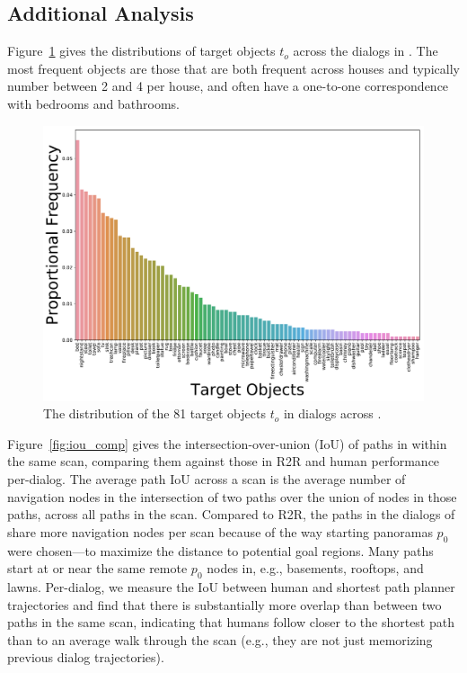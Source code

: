 
\subsection{Additional \dataset{} Analysis}

Figure~\ref{fig:object_dist} gives the distributions of target objects $t_o$ across the dialogs in \dataset{}.
The most frequent objects are those that are both frequent across houses and typically number between 2 and 4 per house, and often have a one-to-one correspondence with bedrooms and bathrooms.

\begin{figure}[ht]
\centering
\includegraphics[width=0.9\columnwidth]{figures/target_object_distribution.pdf}
\caption{The distribution of the 81 target objects $t_o$ in dialogs across \dataset{}.}
\label{fig:object_dist}
\end{figure}

Figure~\ref{fig:iou_comp} gives the intersection-over-union (IoU) of paths in \dataset{} within the same scan, comparing them against those in R2R and human performance per-dialog.
The average path IoU across a scan is the average number of navigation nodes in the intersection of two paths over the union of nodes in those paths, across all paths in the scan.
Compared to R2R, the paths in the dialogs of \dataset{} share more navigation nodes per scan because of the way starting panoramas $p_0$ were chosen---to maximize the distance to potential goal regions.
Many \dataset{} paths start at or near the same remote $p_0$ nodes in, e.g., basements, rooftops, and lawns.
Per-dialog, we measure the IoU between human \nav{} and shortest path planner trajectories and find that there is substantially more overlap than between two paths in the same scan, indicating that humans follow closer to the shortest path than to an average walk through the scan (e.g., they are not just memorizing previous dialog trajectories).

